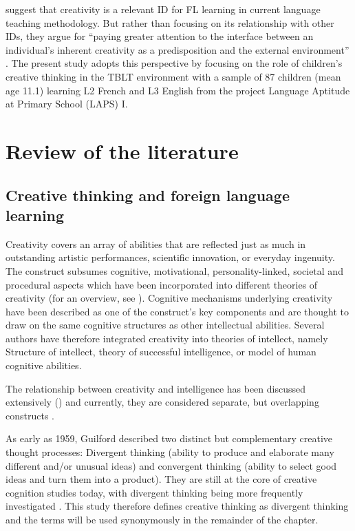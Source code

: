 \documentclass[output=paper]{langsci/langscibook}
\begin{document}
\citet{DoernyeiRyan2015} suggest that creativity is a relevant ID for FL learning in current language teaching methodology. But rather than focusing on its relationship with other IDs, they argue for “paying greater attention to the interface between an individual’s inherent creativity as a predisposition and the external environment” \citep[175]{DoernyeiRyan2015}. The present study adopts this perspective by focusing on the role of children’s creative thinking in the TBLT environment with a sample of 87 children (mean age 11.1) learning L2 French and L3 English from the project Language Aptitude at Primary School (LAPS) I.

\section{Review of the literature}\largerpage
\subsection{Creative thinking and foreign language learning}\label{sec:06:2.1}

Creativity covers an array of abilities that are reflected just as much in outstanding artistic performances, scientific innovation, or everyday ingenuity. The construct subsumes cognitive, motivational, personality-linked, societal and procedural aspects which have been incorporated into different theories of creativity (for an overview, see \citealt{Lubart1994}). Cognitive mechanisms underlying creativity have been described as one of the construct’s key components \citep{Lubart1994} and are thought to draw on the same cognitive structures as other intellectual abilities. Several authors have therefore integrated creativity into theories of intellect, namely  Structure of intellect,  theory of successful intelligence, or  model of human cognitive abilities.

The relationship between creativity and intelligence has been discussed extensively (\citealt{SternbergOHara1999}) and currently, they are considered separate, but overlapping constructs \citep{Vogt2010}.

As early as 1959, Guilford described two distinct but complementary creative thought processes: Divergent thinking (ability to produce and elaborate many different and/or unusual ideas) and convergent thinking (ability to select good ideas and turn them into a product). They are still at the core of creative cognition studies today, with divergent thinking being more frequently investigated \citep{Cropley2006}. This study therefore defines creative thinking as divergent thinking and the terms will be used synonymously in the remainder of the chapter.
\end{document}
